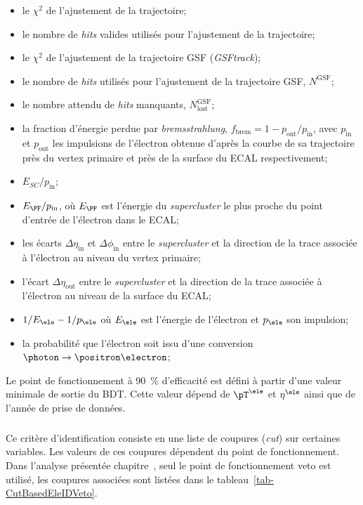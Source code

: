 \begin{itemize}
\item le $\chi^2$ de l'ajustement de la trajectoire;
\item le nombre de \emph{hits} valides utilisés pour l'ajustement de la trajectoire;
\item le $\chi^2$ de l'ajustement de la trajectoire GSF (\emph{GSFtrack});%
\item le nombre de \emph{hits} utilisés pour l'ajustement de la trajectoire GSF, $N^\text{GSF}$;
\item le nombre attendu de \emph{hits} manquants, $N_\text{lost}^\text{GSF}$;
\item la fraction d'énergie perdue par \emph{bremsstrahlung}, $f_\text{brem} = 1-p_\text{out}/p_\text{in}$,
avec $p_\text{in}$ et $p_\text{out}$
les impulsions de l'électron obtenue d'après la courbe de sa trajectoire près du vertex primaire et près de la surface du ECAL respectivement;

\item $E_{SC}/p_\text{in}$;
\item $E_{\PF}/p_\text{in}$, où $E_{\PF}$ est l'énergie du \emph{supercluster} le plus proche du point d'entrée de l'électron dans le ECAL;
\item les écarts $\Delta\eta_\text{in}$ et $\Delta\phi_\text{in}$ entre le \emph{supercluster} et la direction de la trace associée à l'électron au niveau du vertex primaire;
\item l'écart $\Delta\eta_\text{out}$ entre le \emph{supercluster} et la direction de la trace associée à l'électron au niveau de la surface du ECAL;
\item $1/E_{\ele}-1/p_{\ele}$ où $E_{\ele}$ est l'énergie de l'électron et $p_{\ele}$ son impulsion;

\item la probabilité que l'électron soit issu d'une conversion $\photon\to\positron\electron$;
\end{itemize}
\par
Le point de fonctionnement à \SI{90}{\%} d'efficacité est défini à partir d'une valeur minimale de sortie du BDT.
Cette valeur dépend de $\pT^{\ele}$ et $\eta^{\ele}$ ainsi que de l'année de prise de données.
\subparagraph{\CUTBASEDELEID}
Ce critère d'identification consiste en une liste de coupures (\emph{cut}) sur certaines variables.
Les valeurs de ces coupures dépendent du point de fonctionnement.
Dans l'analyse présentée chapitre~, seul le point de fonctionnement \og veto \fg{} est utilisé, les coupures associées sont listées dans le tableau~\ref{tab-CutBasedEleIDVeto}.

